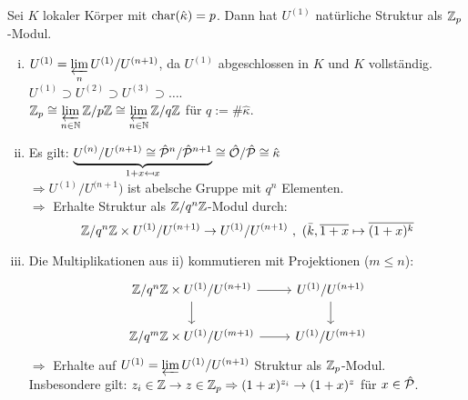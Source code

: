 \begin{Bem}
Sei $K$ lokaler Körper mit $\operatorname{char}(\hat{\kappa})=p$. Dann hat $U^{(1)}$ natürliche Struktur als $\mathbb{Z}_p$-Modul.
\begin{enumerate}[i)]
\item $U^{(1)}=\varprojlim\limits_n U^{(1)}/U^{(n+1)}$, da $U^{(1)}$ abgeschlossen in $K$ und $K$ vollständig.\\
$U^{(1)} \supset U^{(2)} \supset U^{(3)} \supset \dots$.\\
$\mathbb{Z}_p \cong \varprojlim\limits_{n \in \mathbb{N}} \mathbb{Z}/p\mathbb{Z} \cong \varprojlim\limits_{n \in \mathbb{N}} \mathbb{Z}/q\mathbb{Z}$ für $q:=\#\hat{\kappa}$.
\item Es gilt: $\underbrace{U^{(n)}/U^{(n+1)} \cong \hat{\mathcal{P}}^n/\hat{\mathcal{P}}^{n+1}}_{1+x \mapsfrom x} \cong \hat{\mathcal{O}} / \hat{\mathcal{P}} \cong \hat{\kappa}$\\
$\Rightarrow U^{(1)}/U^{(n+1})$ ist abelsche Gruppe mit $q^n$ Elementen.\\
$\Rightarrow$ Erhalte Struktur als $\mathbb{Z}/q^n\mathbb{Z}$-Modul durch:
\[\mathbb{Z}/q^n\mathbb{Z} \times U^{(1)}/U^{(n+1)} \to U^{(1)}/U^{(n+1)} \ , \ (\bar{k}, \overline{1+x} \mapsto \overline{(1+x)^k}\]
\item Die Multiplikationen aus ii) kommutieren mit Projektionen ($m \leq n$):
\[\begin{tikzcd}
\Z/q^n\Z \times U^{(1)}/U^{(n+1)} \arrow[r] \arrow[d] & U^{(1)}/U^{(n+1)} \arrow[d]\\
\Z/q^m\Z \times U^{(1)}/U^{(m+1)} \arrow[r] &U^{(1)}/U^{(m+1)}
\end{tikzcd}\]
$\Rightarrow$ Erhalte auf $U^{(1)}= \varprojlim\limits U^{(1)}/U^{(n+1)}$ Struktur als $\mathbb{Z}_p$-Modul.\\ Insbesondere gilt: $z_i \in \mathbb{Z} \to z \in \mathbb{Z}_p \Rightarrow (1+x)^{z_i} \to (1+x)^z$ für $x \in \hat{\mathcal{P}}$.
\end{enumerate}
\end{Bem}
